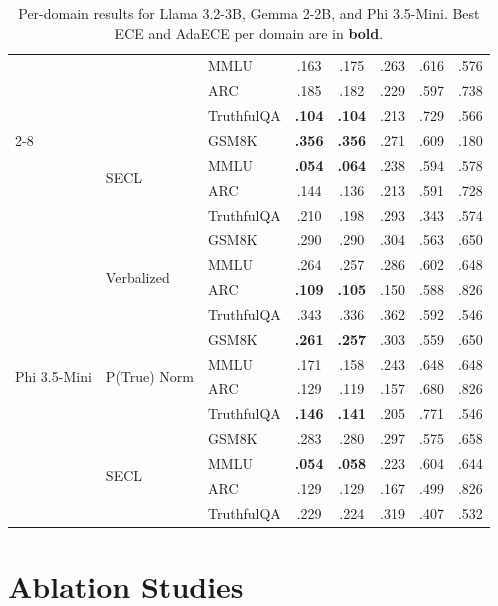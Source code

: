 \begin{table}[ht]
\begin{tabular}{lllccccc}
& & MMLU       & .163 & .175 & .263 & .616 & .576 \\
& & ARC        & .185 & .182 & .229 & .597 & .738 \\
& & TruthfulQA & \textbf{.104} & \textbf{.104} & .213 & .729 & .566 \\
\cmidrule{2-8}
& \multirow{4}{*}{SECL} 
  & GSM8K      & \textbf{.356} & \textbf{.356} & .271 & .609 & .180 \\
& & MMLU       & \textbf{.054} & \textbf{.064} & .238 & .594 & .578 \\
& & ARC        & .144 & .136 & .213 & .591 & .728 \\
& & TruthfulQA & .210 & .198 & .293 & .343 & .574 \\
\midrule
\multirow{12}{*}{Phi 3.5-Mini} & \multirow{4}{*}{Verbalized} 
  & GSM8K      & .290 & .290 & .304 & .563 & .650 \\
& & MMLU       & .264 & .257 & .286 & .602 & .648 \\
& & ARC        & \textbf{.109} & \textbf{.105} & .150 & .588 & .826 \\
& & TruthfulQA & .343 & .336 & .362 & .592 & .546 \\
\cmidrule{2-8}
& \multirow{4}{*}{P(True) Norm} 
  & GSM8K      & \textbf{.261} & \textbf{.257} & .303 & .559 & .650 \\
& & MMLU       & .171 & .158 & .243 & .648 & .648 \\
& & ARC        & .129 & .119 & .157 & .680 & .826 \\
& & TruthfulQA & \textbf{.146} & \textbf{.141} & .205 & .771 & .546 \\
\cmidrule{2-8}
& \multirow{4}{*}{SECL} 
  & GSM8K      & .283 & .280 & .297 & .575 & .658 \\
& & MMLU       & \textbf{.054} & \textbf{.058} & .223 & .604 & .644 \\
& & ARC        & .129 & .129 & .167 & .499 & .826 \\
& & TruthfulQA & .229 & .224 & .319 & .407 & .532 \\
\bottomrule
\end{tabular}
\caption{Per-domain results for Llama 3.2-3B, Gemma 2-2B, and Phi 3.5-Mini. Best ECE and AdaECE per domain are in \textbf{bold}.}
\label{tab:per_domain_combined}
\end{table}

\clearpage

\twocolumn
\section{Ablation Studies} \label{app:ablations}

